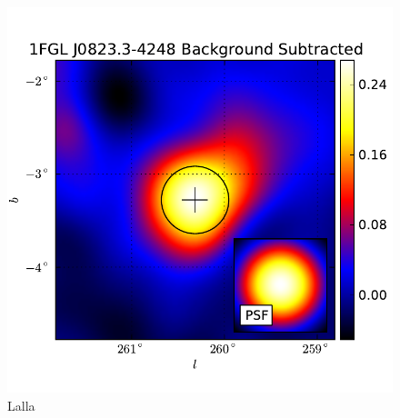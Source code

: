 \documentclass{emulateapj}
\begin{document}
  \begin{figure}
    \begin{center}
      \includegraphics[type=pdf,ext=.pdf,read=.pdf]{source_plots/source_1FGL_J0823.3-4248}
    \end{center}
    \caption{Lalla}
  \end{figure}
\end{document}
